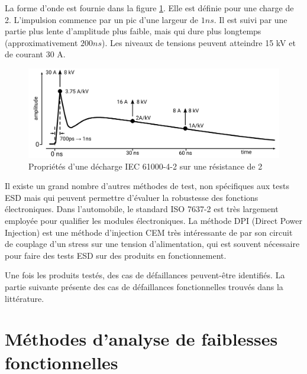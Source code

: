 La forme d'onde est fournie dans la figure \ref{iec_pulse}.
Elle est définie pour une charge de 2\textOmega{}.
L'impulsion commence par un pic d'une largeur de $1ns$.
Il est suivi par une partie plus lente d'amplitude plus faible, mais qui dure plus longtemps (approximativement $200ns$).
Les niveaux de tensions peuvent atteindre 15 kV et de courant 30 A.

\begin{figure}[!h]
  \centering
  \includegraphics[width=\textwidth]{src/1/figures/iec61000-4-2_waveform.pdf}
  \caption{Propriétés d'une décharge IEC 61000-4-2 sur une résistance de 2\textOmega{}}
  \label{iec_pulse}
\end{figure}

Il existe un grand nombre d'autres méthodes de test, non spécifiques aux tests ESD mais qui peuvent permettre d'évaluer la robustesse des fonctions électroniques.
Dans l'automobile, le standard ISO 7637-2 est très largement employée pour qualifier les modules électroniques.
La méthode DPI (Direct Power Injection) est une méthode d'injection CEM très intéressante de par son circuit de couplage d'un stress sur une tension d'alimentation, qui est souvent nécessaire pour faire des tests ESD sur des produits en fonctionnement.

Une fois les produits testés, des cas de défaillances peuvent-être identifiés.
La partie suivante présente des cas de défaillances fonctionnelles trouvés dans la littérature.

\section{Méthodes d'analyse de faiblesses fonctionnelles}

